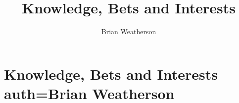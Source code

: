 \documentclass[oneside]{book}
\title{Knowledge, Bets and Interests}
\author{Brian Weatherson}
\begin{document}



\setcounter{paper}{0}

\chapter[Knowledge, Bets and Interests]{Knowledge, Bets and Interests auth=Brian Weatherson}











\end{document}
